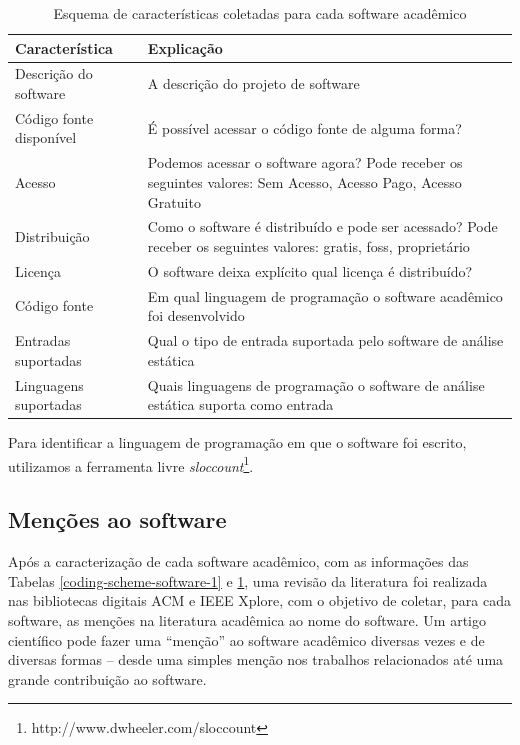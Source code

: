\begin{table}[h]
\caption{Esquema de características coletadas para cada software acadêmico}
\centering
\begin{tabular}{ l p{11cm} }
  \hline
  Característica           & Explicação \\
  \hline
  Descrição do software    & A descrição do projeto de software \\
  Código fonte disponível  & É possível acessar o código fonte de alguma forma? \\
  Acesso                   & Podemos acessar o software agora? Pode receber os seguintes valores: Sem Acesso, Acesso Pago, Acesso Gratuito \\
  Distribuição             & Como o software é distribuído e pode ser acessado? Pode receber os seguintes valores: gratis, foss, proprietário \\
  Licença                  & O software deixa explícito qual licença é distribuído? \\
  Código fonte             & Em qual linguagem de programação o software acadêmico foi desenvolvido \\
  Entradas suportadas      & Qual o tipo de entrada suportada pelo software de análise estática \\
  Linguagens suportadas    & Quais linguagens de programação o software de análise estática suporta como entrada \\
  \hline
\end{tabular}
\label{coding-scheme-software}
\end{table}

Para identificar a linguagem de programação em que o software foi escrito, utilizamos a
ferramenta livre {\it sloccount}\footnote{http://www.dwheeler.com/sloccount}.

\subsection{Menções ao software}

Após a caracterização de cada software acadêmico, com as informações das Tabelas
\ref{coding-scheme-software-1} e 
\ref{coding-scheme-software}, 
uma revisão da literatura foi realizada nas bibliotecas digitais ACM e IEEE Xplore,
com o objetivo de coletar,
para cada software, as menções na literatura acadêmica ao nome do software.
Um artigo científico pode fazer uma ``menção'' ao software acadêmico 
diversas vezes e de diversas formas -- desde uma simples
menção nos trabalhos relacionados até uma grande contribuição ao software.


